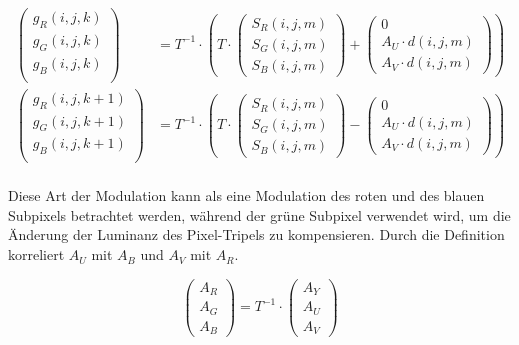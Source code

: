 \begin{equation}
\begin{split}
  \begin{pmatrix}
  g_R(i,j,k) \\
  g_G(i,j,k) \\
  g_B(i,j,k) \\
\end{pmatrix} &= T^{-1} \cdot \left( T \cdot \begin{pmatrix}
  S_R(i,j,m) \\
  S_G(i,j,m) \\
  S_B(i,j,m) 
  \end{pmatrix}  + \begin{pmatrix}
  0 \\
  A_U \cdot d(i,j,m) \\
  A_V \cdot d(i,j,m) 
  \end{pmatrix} \right) \\  
  \begin{pmatrix}
  g_R(i,j,k+1) \\
  g_G(i,j,k+1) \\
  g_B(i,j,k+1) \\
\end{pmatrix} &= T^{-1} \cdot \left( T \cdot \begin{pmatrix}
  S_R(i,j,m) \\
  S_G(i,j,m) \\
  S_B(i,j,m) 
  \end{pmatrix}  - \begin{pmatrix}
  0 \\
  A_U \cdot d(i,j,m) \\
  A_V \cdot d(i,j,m) 
  \end{pmatrix} \right) \\ 
\end{split}
\end{equation}

Diese Art der Modulation kann als eine Modulation des roten und des blauen Subpixels betrachtet werden, während der grüne Subpixel verwendet wird, um die Änderung der Luminanz des Pixel-Tripels zu kompensieren. Durch die Definition korreliert $A_U$ mit $A_B$ und $A_V$ mit $A_R$.

\begin{equation}
   \begin{pmatrix}
   A_R \\
   A_G \\
   A_B
  \end{pmatrix}  = T^{-1} \cdot \begin{pmatrix}
   A_Y \\
   A_U \\
   A_V
  \end{pmatrix}
\end{equation}



